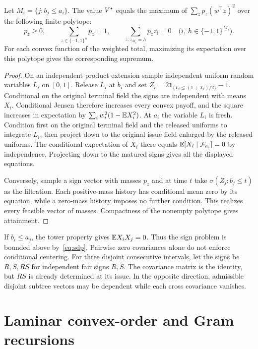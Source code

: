 \begin{theorem}\label{thm:lp}
Let $M_i=\{j:b_j\le a_i\}$. The value $V^\star$ equals the maximum of
$\sum_z p_z(w^\top z)^2$ over the following finite polytope:
\[
 p_z\ge0,\qquad \sum_{z\in\{-1,1\}^n}p_z=1,\qquad
 \sum_{z:z_{M_i}=h}p_z z_i=0
 \quad\bigl(i,\ h\in\{-1,1\}^{M_i}\bigr).
\]
For each convex function of the weighted total, maximizing its
expectation over this polytope gives the corresponding supremum.
\end{theorem}
\begin{proof}
On an independent product extension sample independent uniform
random variables $L_i$ on $[0,1]$. Release $L_i$ at $b_i$ and set
$Z_i=2\mathbf1_{\{L_i\le(1+X_i)/2\}}-1$.
Conditional on the original terminal field the signs are independent
with means $X_i$. Conditional Jensen therefore increases every convex
payoff, and the square increases in expectation by
$\sum_i w_i^2(1-\mathbb E X_i^2)$. At $a_i$ the variable $L_i$ is fresh.
Condition first on the original terminal field and the released uniforms
to integrate $L_i$, then project down to the original issue field
enlarged by the released uniforms. The conditional expectation of $X_i$
there equals $\mathbb E[X_i\mid\mathcal F_{a_i}]=0$ by independence. Projecting
down to the matured signs gives all the displayed equations.

Conversely, sample a sign vector with masses $p_z$ and at time $t$ take
$\sigma(Z_j:b_j\le t)$ as the filtration. Each positive-mass history
has conditional mean zero by its equation, while a zero-mass history
imposes no further condition. This realizes every feasible vector of
masses. Compactness of the nonempty polytope gives attainment.
\end{proof}

If $b_i\le a_j$, the tower property gives $\mathbb E X_iX_j=0$. Thus the sign
problem is bounded above by~\eqref{eq:sdp}. Pairwise zero covariances alone
do not enforce conditional centering. For three disjoint consecutive
intervals, let the signs be $R,S,RS$ for independent fair signs $R,S$.
The covariance matrix is the identity, but $RS$ is already determined
at its issue. In the opposite direction, admissible disjoint subtree
vectors may be dependent while each cross covariance vanishes.

\section{Laminar convex-order and Gram recursions}

